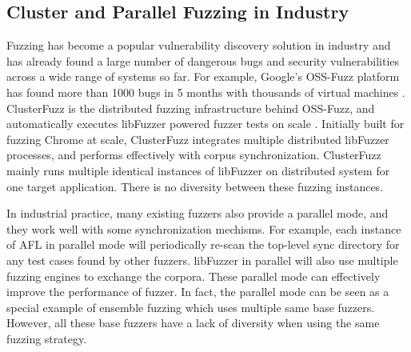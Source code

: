 \subsection{Cluster and Parallel Fuzzing in Industry}
Fuzzing has become a popular vulnerability discovery solution in industry \cite{liang2018fuzz} and has already found a large number of dangerous bugs and security vulnerabilities across a wide range of systems so far. For example, Google's OSS-Fuzz \cite{OSS-Fuzz} platform has found more than 1000 bugs in 5 months with thousands of virtual machines \cite{bug-report}.
ClusterFuzz is the distributed fuzzing infrastructure behind OSS-Fuzz, and automatically executes libFuzzer powered fuzzer tests on scale \cite{ClusterFuzz,ClusterFuzz_two}. Initially built for fuzzing Chrome at scale, ClusterFuzz integrates multiple distributed libFuzzer processes, and performs effectively with corpus synchronization. 
ClusterFuzz mainly runs multiple identical instances of libFuzzer on distributed system for one target application. There is no diversity between these fuzzing instances.

In industrial practice, many existing fuzzers also provide a parallel mode, and they work well with some synchronization mechisms.
For example, each instance of AFL in parallel mode will periodically re-scan the top-level sync directory for any test cases found by other fuzzers\cite{AFLP1, AFLP2}. libFuzzer in parallel will also use multiple fuzzing engines to exchange the corpora\cite{libFuzzerP}.
These parallel mode can effectively improve the performance of fuzzer. 
In fact, the parallel mode can be seen as a special example of ensemble fuzzing which uses multiple same base fuzzers. However, all these base fuzzers have a lack of diversity when using the same fuzzing strategy. %


